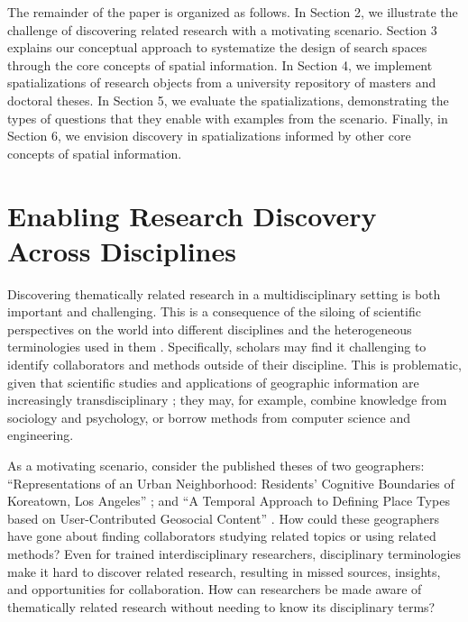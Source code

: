 \documentclass[a4paper,UKenglish]{lipics-v2018}
\begin{document}
The remainder of the paper is organized as follows. In Section 2, we illustrate the challenge of discovering related research with a motivating scenario. Section 3 explains our conceptual approach to systematize the design of search spaces through the core concepts of spatial information. In Section 4, we implement spatializations of research objects from a university repository of masters and doctoral theses. In Section 5, we evaluate the spatializations, demonstrating the types of questions that they enable with examples from the scenario. Finally, in Section 6, we envision discovery in spatializations informed by other core concepts of spatial information.

\section{Enabling Research Discovery Across Disciplines}
\label{sec:motivation}
Discovering thematically related research in a multidisciplinary setting is both important and challenging. This is a consequence of the siloing of scientific perspectives on the world into different disciplines and the heterogeneous terminologies used in them \cite{Soergel1999a}. Specifically, scholars may find it challenging to identify collaborators and methods outside of their discipline. This is problematic, given that scientific studies and applications of geographic information are increasingly transdisciplinary \cite{Kuhn2012e}; they may, for example, combine knowledge from sociology and psychology, or borrow methods from computer science and engineering.

As a motivating scenario, consider the published theses of two geographers: “Representations of an Urban Neighborhood: Residents' Cognitive Boundaries of Koreatown, Los Angeles” \cite{Bae2018}; and “A Temporal Approach to Defining Place Types based on User-Contributed Geosocial Content” \cite{mckenzie2015temporal}. How could these geographers have gone about finding collaborators studying related topics or using related methods? Even for trained interdisciplinary researchers, disciplinary terminologies make it hard to discover related research, resulting in missed sources, insights, and opportunities for collaboration. How can researchers be made aware of thematically related research without needing to know its disciplinary terms?  
\end{document}
